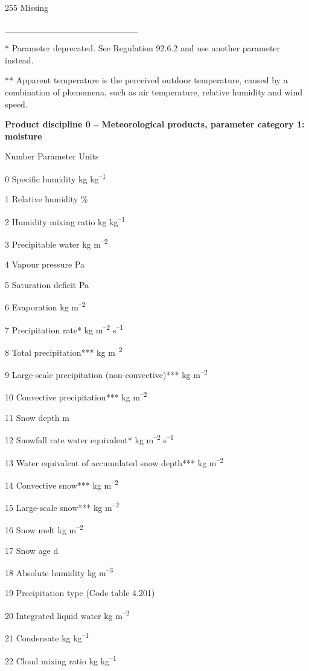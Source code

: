 255 Missing

\_\_\_\_\_\_\_\_\_\_\_\_\_\_\_\_\_\_\_\_\_

* Parameter deprecated. See Regulation 92.6.2 and use another parameter instead.

** Apparent temperature is the perceived outdoor temperature, caused by a combination of phenomena, such as air temperature, relative humidity and wind speed.

\textbf{Product discipline 0 -- Meteorological products, parameter category 1: moisture}

Number Parameter Units

0 Specific humidity kg kg\textsuperscript{--1}

1 Relative humidity \%

2 Humidity mixing ratio kg kg\textsuperscript{--1}

3 Precipitable water kg m\textsuperscript{--2}

4 Vapour pressure Pa

5 Saturation deficit Pa

6 Evaporation kg m\textsuperscript{--2}

7 Precipitation rate* kg m\textsuperscript{--2} s\textsuperscript{--1}

8 Total precipitation*** kg m\textsuperscript{--2}

9 Large-scale precipitation (non-convective)*** kg m\textsuperscript{--2}

10 Convective precipitation*** kg m\textsuperscript{--2}

11 Snow depth m

12 Snowfall rate water equivalent* kg m\textsuperscript{--2} s\textsuperscript{--1}

13 Water equivalent of accumulated snow depth*** kg m\textsuperscript{--2}

14 Convective snow*** kg m\textsuperscript{--2}

15 Large-scale snow*** kg m\textsuperscript{--2}

16 Snow melt kg m\textsuperscript{--2}

17 Snow age d

18 Absolute humidity kg m\textsuperscript{--3}

19 Precipitation type (Code table 4.201)

20 Integrated liquid water kg m\textsuperscript{--2}

21 Condensate kg kg\textsuperscript{--1}

22 Cloud mixing ratio kg kg\textsuperscript{--1}

